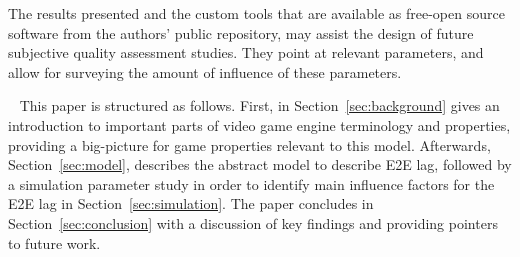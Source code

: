 The results presented and the custom tools that are available as free-open source software from the authors' public repository, may assist the design of future subjective quality assessment studies. They point at relevant parameters, and allow for surveying the amount of influence of these parameters.


~\newline
This paper is structured as follows. First, in Section~\ref{sec:background} gives an introduction to important parts of video game engine terminology and properties, providing a big-picture for game properties relevant to this model. Afterwards, Section~\ref{sec:model}, describes the abstract model to describe \gls{E2E} lag, followed by a simulation parameter study in order to identify main influence factors for the \gls{E2E} lag in Section~\ref{sec:simulation}. The paper concludes in Section~\ref{sec:conclusion} with a discussion of key findings and providing pointers to future work.




